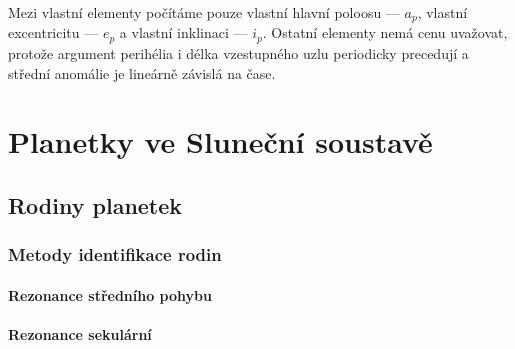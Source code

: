 \documentclass[A4paper, 12pt, oneside]{book}
\begin{document}
Mezi vlastní elementy počítáme pouze vlastní hlavní poloosu --- $a_p$, vlastní excentricitu --- $e_p$ a vlastní inklinaci --- $i_p$. Ostatní elementy nemá cenu uvažovat, protože argument perihélia i délka vzestupného uzlu periodicky precedují a střední anomálie je lineárně závislá na čase.
\chapter{Planetky ve Sluneční soustavě}
\section{Rodiny planetek}
\subsection{Metody identifikace rodin}
\subsubsection{Rezonance středního pohybu}
\subsubsection{Rezonance sekulární}
\end{document}
